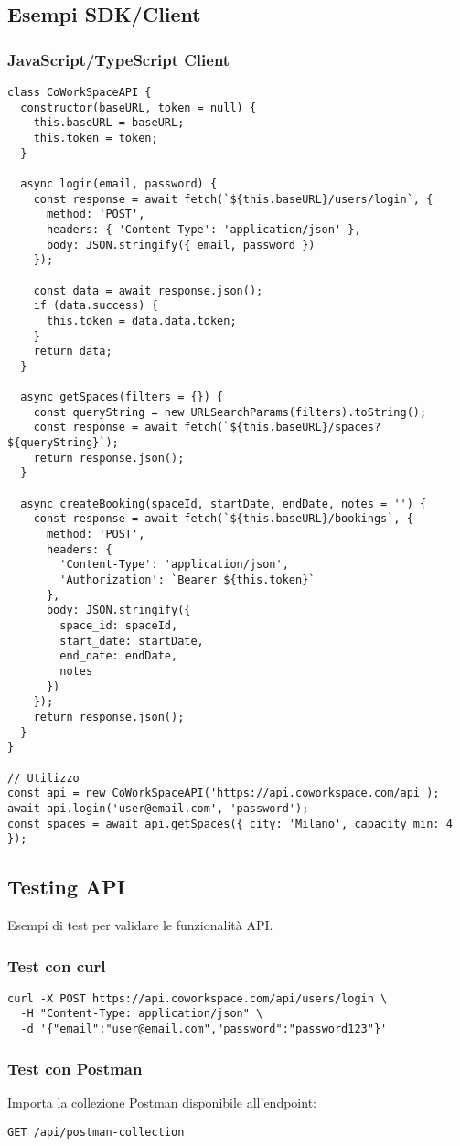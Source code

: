 \subsection{Esempi SDK/Client}

\subsubsection{JavaScript/TypeScript Client}
\begin{lstlisting}[caption=Esempio Client JavaScript]
class CoWorkSpaceAPI {
  constructor(baseURL, token = null) {
    this.baseURL = baseURL;
    this.token = token;
  }
  
  async login(email, password) {
    const response = await fetch(`${this.baseURL}/users/login`, {
      method: 'POST',
      headers: { 'Content-Type': 'application/json' },
      body: JSON.stringify({ email, password })
    });
    
    const data = await response.json();
    if (data.success) {
      this.token = data.data.token;
    }
    return data;
  }
  
  async getSpaces(filters = {}) {
    const queryString = new URLSearchParams(filters).toString();
    const response = await fetch(`${this.baseURL}/spaces?${queryString}`);
    return response.json();
  }
  
  async createBooking(spaceId, startDate, endDate, notes = '') {
    const response = await fetch(`${this.baseURL}/bookings`, {
      method: 'POST',
      headers: {
        'Content-Type': 'application/json',
        'Authorization': `Bearer ${this.token}`
      },
      body: JSON.stringify({
        space_id: spaceId,
        start_date: startDate,
        end_date: endDate,
        notes
      })
    });
    return response.json();
  }
}

// Utilizzo
const api = new CoWorkSpaceAPI('https://api.coworkspace.com/api');
await api.login('user@email.com', 'password');
const spaces = await api.getSpaces({ city: 'Milano', capacity_min: 4 });
\end{lstlisting}

\subsection{Testing API}
Esempi di test per validare le funzionalità API.

\subsubsection{Test con curl}
\begin{lstlisting}[style=httpstyle, caption=Test Login con curl]
curl -X POST https://api.coworkspace.com/api/users/login \
  -H "Content-Type: application/json" \
  -d '{"email":"user@email.com","password":"password123"}'
\end{lstlisting}

\subsubsection{Test con Postman}
Importa la collezione Postman disponibile all'endpoint:
\begin{lstlisting}[style=httpstyle]
GET /api/postman-collection
\end{lstlisting}